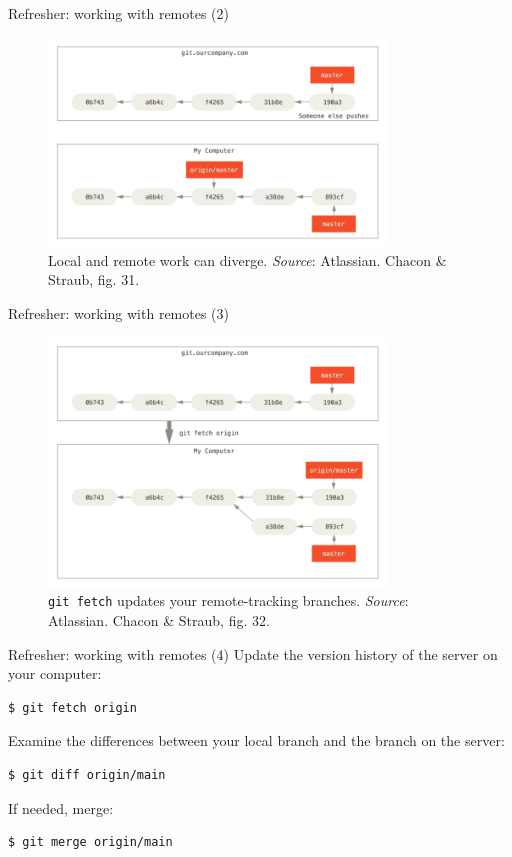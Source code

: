\documentclass[handout]{beamer}
\begin{document}
\begin{frame}{Refresher: working with remotes (2)}
\begin{figure}
	\includegraphics[width=0.8\textwidth]{figures/fig31_local_forward.png}
	\caption{Local and remote work can diverge. \textit{Source}: Atlassian. Chacon \& Straub, fig. 31.}
\end{figure}
\end{frame}

\begin{frame}{Refresher: working with remotes (3)}
\begin{figure}
	\includegraphics[width=0.8\textwidth]{figures/fig32_diverge.png}
	\caption{\texttt{git fetch} updates your remote-tracking branches. \textit{Source}: Atlassian. Chacon \& Straub, fig. 32.}
\end{figure}
\end{frame}

\begin{frame}[fragile]{Refresher: working with remotes (4)}
Update the version history of the server on your computer:
\begin{lstlisting}
$ git fetch origin
\end{lstlisting}
Examine the differences between your local branch and the branch on the server:
\begin{lstlisting}
$ git diff origin/main
\end{lstlisting}
If needed, merge:
\begin{lstlisting}
$ git merge origin/main
\end{lstlisting}

\end{frame}
\end{document}
